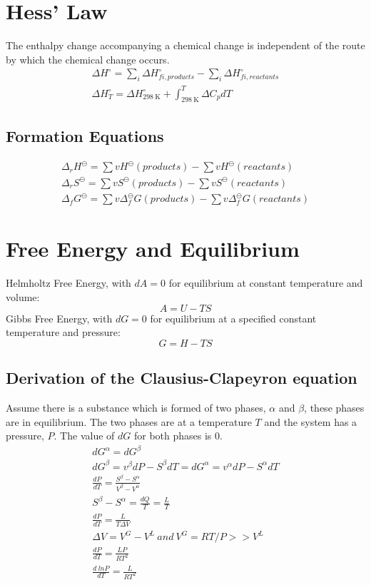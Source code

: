\documentclass[10pt, oneside, twocolumn]{article}
\numberwithin{equation}{section}
\begin{document}
	\section{Hess' Law}
		The enthalpy change accompanying a chemical change is independent of the route by which the chemical change occurs.
		\begin{gather}
		\Delta H^{\circ}=\sum_i \Delta H^{\circ}_{fi,products}-\sum_i \Delta H^{\circ}_{fi,reactants}\\
		\Delta H^\circ_T=\Delta H^\circ_{\SI{298}{\kelvin}}+\int_{\SI{298}{\kelvin}}^{T}\Delta C_p dT
		\end{gather}
		\subsection{Formation Equations}
			\begin{gather}
			\Delta_r H^{\ominus}=\sum vH^\ominus(products)-\sum vH^\ominus(reactants)\\
			\Delta_r S^{\ominus}=\sum vS^\ominus(products)-\sum vS^\ominus(reactants)\\
			\Delta_f G^{\ominus}=\sum v\Delta_f^\ominus G(products)-\sum v\Delta_f^\ominus G(reactants)
			\end{gather}
	\section{Free Energy and Equilibrium}
		Helmholtz Free Energy, with $dA=0$ for equilibrium at constant temperature and volume:
		\begin{equation}
		A=U-TS
		\end{equation}
		Gibbs Free Energy, with $dG=0$ for equilibrium at a specified constant temperature and pressure:
		\begin{equation}
		G=H-TS \label{eq:gibbs}
		\end{equation}
		\subsection{Derivation of the Clausius-Clapeyron equation}
			Assume there is a substance which is formed of two phases, $\alpha$ and $\beta$, these phases are in equilibrium. The two phases are at a temperature $T$ and the system has  a pressure, $P$. The value of $dG$ for both phases is 0.
			\begin{gather}
			dG^\alpha=dG^\beta\\
			dG^\beta=v^\beta dP-S^\beta dT=dG^\alpha=v^\alpha dP-S^\alpha dT\\
			\frac{dP}{dT}=\frac{S^\beta-S^\alpha}{V^\beta-V^\alpha}\\
			S^\beta-S^\alpha=\frac{dQ}{T}=\frac{L}{T}\\
			\frac{dP}{dT}=\frac{L}{T\Delta V}\\
			\Delta V=V^G-V^L \ and \ V^G =RT/P >> V^L \tag{Ideal Gas}\\
			\frac{dP}{dT}=\frac{LP}{RT^2}\\
			\frac{d \ ln P}{dT}=\frac{L}{RT^2}
			\end{gather}
\end{document}
